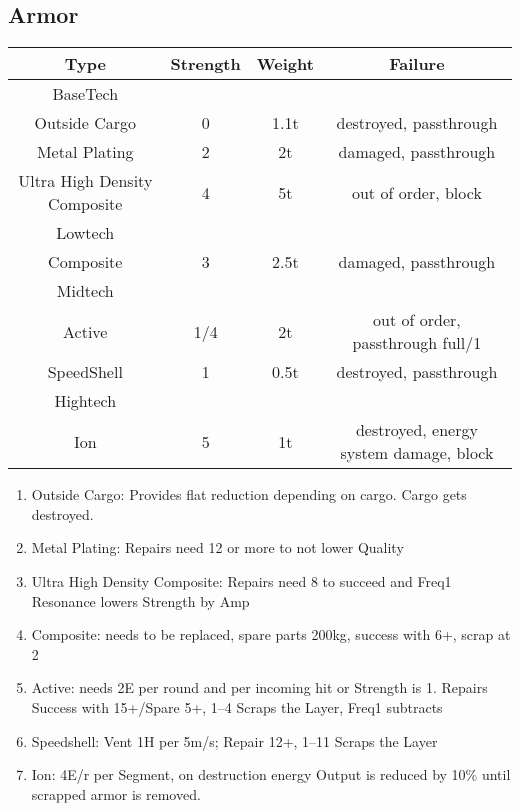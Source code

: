 \subsection{Armor}\label{subsec:armor}
\begin{tabular}{c|ccc}
    Type & Strength & Weight & Failure\\
    \hline BaseTech&&&\\
    Outside Cargo & 0 & 1.1t & destroyed, passthrough\\
    Metal Plating & 2 & 2t & damaged, passthrough\\
    Ultra High Density Composite & 4 & 5t & out of order, block\\
    \hline Lowtech &&&\\
    Composite & 3 & 2.5t & damaged, passthrough \\
    \hline Midtech &&&\\
    Active & 1/4 & 2t & out of order, passthrough full/1\\
    SpeedShell & 1 & 0.5t & destroyed, passthrough \\
    \hline Hightech &&&\\
    Ion & 5 & 1t & destroyed, energy system damage, block 
\end{tabular}

\begin{enumerate}[label = - ]
    \item Outside Cargo: Provides flat reduction depending on cargo.
    Cargo gets destroyed.
    \item Metal Plating: Repairs need 12 or more to not lower Quality
    \item Ultra High Density Composite: Repairs need 8 to succeed and Freq1 Resonance lowers Strength by Amp
    \item Composite: needs to be replaced, spare parts 200kg, success with 6+, scrap at 2
    \item Active: needs 2E per round and per incoming hit or Strength is 1.
    Repairs Success with 15+/Spare 5+, 1--4 Scraps the Layer, Freq1 subtracts
    \item Speedshell: Vent 1H per 5m/s;
    Repair 12+, 1--11 Scraps the Layer
    \item Ion: 4E/r per Segment, on destruction energy Output is reduced by 10\% until scrapped armor is removed.
\end{enumerate}

